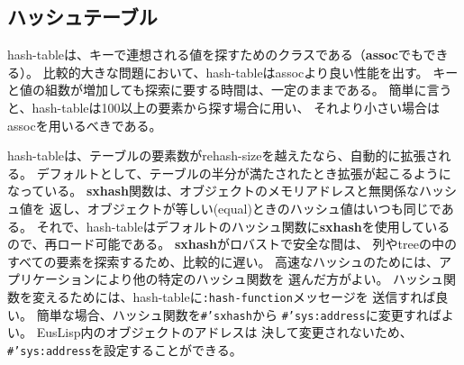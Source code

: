 \subsection{ハッシュテーブル}

hash-tableは、キーで連想される値を探すためのクラスである（{\bf assoc}でもできる）。
比較的大きな問題において、hash-tableはassocより良い性能を出す。
キーと値の組数が増加しても探索に要する時間は、一定のままである。
簡単に言うと、hash-tableは100以上の要素から探す場合に用い、
それより小さい場合はassocを用いるべきである。

hash-tableは、テーブルの要素数がrehash-sizeを越えたなら、自動的に拡張される。
デフォルトとして、テーブルの半分が満たされたとき拡張が起こるようになっている。
{\bf sxhash}関数は、オブジェクトのメモリアドレスと無関係なハッシュ値を
返し、オブジェクトが等しい(equal)ときのハッシュ値はいつも同じである。
それで、hash-tableはデフォルトのハッシュ関数に{\bf sxhash}を使用している
ので、再ロード可能である。
{\bf sxhash}がロバストで安全な間は、
列やtreeの中のすべての要素を探索するため、比較的に遅い。
高速なハッシュのためには、アプリケーションにより他の特定のハッシュ関数を
選んだ方がよい。
ハッシュ関数を変えるためには、hash-tableに{\tt :hash-function}メッセージを
送信すれば良い。
簡単な場合、ハッシュ関数を{\tt \#'sxhash}から
{\tt \#'sys:address}に変更すればよい。
EusLisp内のオブジェクトのアドレスは
決して変更されないため、{\tt \#'sys:address}を設定することができる。


